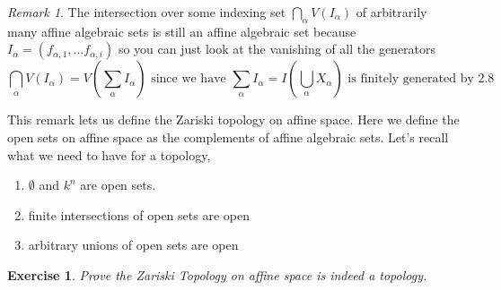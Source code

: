 \documentclass[11pt,a4paper]{article}
\theoremstyle{plain}
\newtheorem{exercise}[theorem]{Exercise}
\theoremstyle{definition}
\theoremstyle{remark}
\newtheorem{remark}[theorem]{Remark}
\begin{document}
\begin{remark}
    The intersection over some indexing set $\bigcap_\alpha V(I_\alpha)$ of arbitrarily many affine algebraic sets is still an affine algebraic set because $I_\alpha = (f_{\alpha,1}, \dots f_{\alpha, i})$ so you can just look at the vanishing of all the generators $$ \bigcap_\alpha V(I_\alpha) = V\left(\sum_{\alpha} I_\alpha\right) \text{ since we have } \sum_\alpha I_\alpha = I\left(\bigcup_\alpha X_\alpha\right) \text{ is finitely generated by 2.8}$$ 
\end{remark}

\noindent
This remark lets us define the Zariski topology on affine space. Here we define the open sets on affine space as the complements of affine algebraic sets. Let's recall what we need to have for a topology, \begin{enumerate}
    \item $\emptyset$ and $k^n$ are open sets.
    \item finite intersections of open sets are open
    \item arbitrary unions of open sets are open
\end{enumerate}

\begin{exercise}
    Prove the Zariski Topology on affine space is indeed a topology.
\end{exercise}
\end{document}
